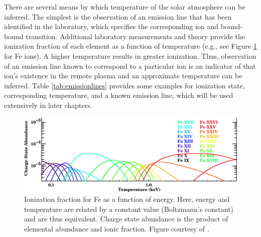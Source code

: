 There are several means by which temperature of the solar atmosphere can be inferred. The simplest is the observation of an emission line that has been identified in the laboratory, which specifies the corresponding ion and bound-bound transition. Additional laboratory measurements and theory provide the ionization fraction of each element as a function of temperature (e.g., see Figure \ref{fig:feionizationfraction} for Fe ions). A higher temperature results in greater ionization. Thus, observation of an emission line known to correspond to a particular ion is an indicator of that ion's existence in the remote plasma and an approximate temperature can be inferred. Table \ref{tab:emissionlines} provides some examples for ionization state, corresponding temperature, and a known emission line, which will be used extensively in later chapters. 

\begin{figure}[!h]
    \begin{center}
	    \includegraphics[width=120mm]{Images/FeIonizationFraction.png}
    \end{center}
    \caption[Fe ionization fraction]{
        Ionization fraction for Fe as a function of energy. Here, energy and temperature are related by a constant value 
        (Boltzmann's constant) and are thus equivalent. Charge state abundance is the product of elemental abundance and 
        ionic fraction. Figure courtesy of \citet{Peterson2006}. 
    }
    \label{fig:feionizationfraction}
\end{figure}

